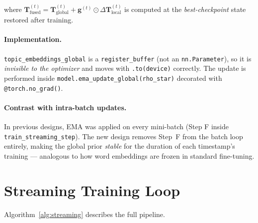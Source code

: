\documentclass[11pt,a4paper]{article}
\begin{document}
where $\mathbf{T}_\text{fused}^{(t)} = \mathbf{T}_\text{global}^{(t)} +
\mathbf{g}^{(t)} \odot \Delta\mathbf{T}_\text{local}^{(t)}$ is computed
at the \emph{best-checkpoint} state restored after training.

\paragraph{Implementation.} \texttt{topic\_embeddings\_global} is a
\texttt{register\_buffer} (not an \texttt{nn.Parameter}), so it is
\emph{invisible to the optimizer} and moves with \texttt{.to(device)} correctly.
The update is performed inside \texttt{model.ema\_update\_global(rho\_star)}
decorated with \texttt{@torch.no\_grad()}.

\paragraph{Contrast with intra-batch updates.} In previous designs, EMA was
applied on every mini-batch (Step F inside \texttt{train\_streaming\_step}).
The new design removes Step~F from the batch loop entirely, making the global
prior \emph{stable} for the duration of each timestamp's training — analogous
to how word embeddings are frozen in standard fine-tuning.

\section{Streaming Training Loop}

Algorithm~\ref{alg:streaming} describes the full pipeline.
\end{document}
